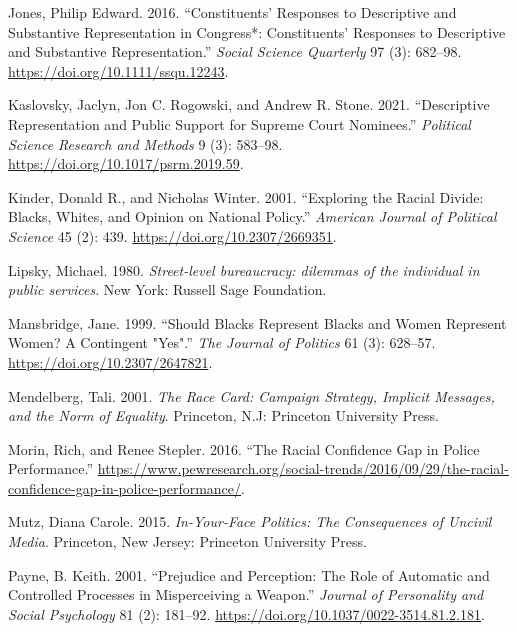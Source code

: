 \documentclass[
  12pt,
]{article}
\newlength{\cslhangindent}
\newlength{\cslentryspacingunit} %
\newenvironment{CSLReferences}[2] %
 {%
  \setlength{\parindent}{0pt}
  \ifodd #1
  \let\oldpar\par
  \def\par{\hangindent=\cslhangindent\oldpar}
  \fi
  \setlength{\parskip}{#2\cslentryspacingunit}
 }%
 {}
\begin{document}
\begin{CSLReferences}{1}{0}
\leavevmode{}%
Jones, Philip Edward. 2016. {``Constituents' Responses to Descriptive
and Substantive Representation in Congress*: Constituents' Responses to
Descriptive and Substantive Representation.''} \emph{Social Science
Quarterly} 97 (3): 682--98. \url{https://doi.org/10.1111/ssqu.12243}.

\leavevmode{}%
Kaslovsky, Jaclyn, Jon C. Rogowski, and Andrew R. Stone. 2021.
{``Descriptive Representation and Public Support for Supreme Court
Nominees.''} \emph{Political Science Research and Methods} 9 (3):
583--98. \url{https://doi.org/10.1017/psrm.2019.59}.

\leavevmode{}%
Kinder, Donald R., and Nicholas Winter. 2001. {``Exploring the Racial
Divide: Blacks, Whites, and Opinion on National Policy.''}
\emph{American Journal of Political Science} 45 (2): 439.
\url{https://doi.org/10.2307/2669351}.

\leavevmode{}%
Lipsky, Michael. 1980. \emph{Street-level bureaucracy: dilemmas of the
individual in public services}. New York: Russell Sage Foundation.

\leavevmode{}%
Mansbridge, Jane. 1999. {``Should Blacks Represent Blacks and Women
Represent Women? A Contingent {"}Yes{"}.''} \emph{The Journal of
Politics} 61 (3): 628--57. \url{https://doi.org/10.2307/2647821}.

\leavevmode{}%
Mendelberg, Tali. 2001. \emph{The Race Card: Campaign Strategy, Implicit
Messages, and the Norm of Equality}. Princeton, N.J: Princeton
University Press.

\leavevmode{}%
Morin, Rich, and Renee Stepler. 2016. {``The Racial Confidence Gap in
Police Performance.''}
\url{https://www.pewresearch.org/social-trends/2016/09/29/the-racial-confidence-gap-in-police-performance/}.

\leavevmode{}%
Mutz, Diana Carole. 2015. \emph{In-Your-Face Politics: The Consequences
of Uncivil Media}. Princeton, New Jersey: Princeton University Press.

\leavevmode{}%
Payne, B. Keith. 2001. {``Prejudice and Perception: The Role of
Automatic and Controlled Processes in Misperceiving a Weapon.''}
\emph{Journal of Personality and Social Psychology} 81 (2): 181--92.
\url{https://doi.org/10.1037/0022-3514.81.2.181}.


\end{CSLReferences}
\end{document}
